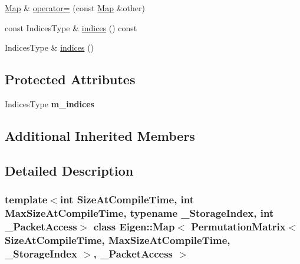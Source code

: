 \begin{DoxyCompactItemize}
\hyperlink{group___core___module_class_eigen_1_1_map}{Map} \& \hyperlink{class_eigen_1_1_map_3_01_permutation_matrix_3_01_size_at_compile_time_00_01_max_size_at_compile_2f9d18bf0084dbfb13fbbfe14adaf22d_a209e4e7eee11a5ca52dbb5c3ec1ffa44}{operator=} (const \hyperlink{group___core___module_class_eigen_1_1_map}{Map} \&other)
\item 
const Indices\+Type \& \hyperlink{class_eigen_1_1_map_3_01_permutation_matrix_3_01_size_at_compile_time_00_01_max_size_at_compile_2f9d18bf0084dbfb13fbbfe14adaf22d_a3f1607f68044608f11a256ba62c2e923}{indices} () const
\item 
Indices\+Type \& \hyperlink{class_eigen_1_1_map_3_01_permutation_matrix_3_01_size_at_compile_time_00_01_max_size_at_compile_2f9d18bf0084dbfb13fbbfe14adaf22d_af9771ec7bda9dfc5c5a6cc9857410c4c}{indices} ()
\end{DoxyCompactItemize}
\subsection*{Protected Attributes}
\begin{DoxyCompactItemize}
\item 
\mbox{\label{class_eigen_1_1_map_3_01_permutation_matrix_3_01_size_at_compile_time_00_01_max_size_at_compile_2f9d18bf0084dbfb13fbbfe14adaf22d_ae4e7ea09e767a84127dca9cdea9a4515}} 
Indices\+Type {\bfseries m\+\_\+indices}
\end{DoxyCompactItemize}
\subsection*{Additional Inherited Members}


\subsection{Detailed Description}
\subsubsection*{template$<$int Size\+At\+Compile\+Time, int Max\+Size\+At\+Compile\+Time, typename \+\_\+\+Storage\+Index, int \+\_\+\+Packet\+Access$>$\newline
class Eigen\+::\+Map$<$ Permutation\+Matrix$<$ Size\+At\+Compile\+Time, Max\+Size\+At\+Compile\+Time, \+\_\+\+Storage\+Index $>$, \+\_\+\+Packet\+Access $>$}



